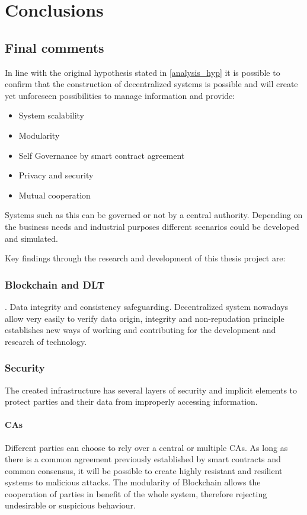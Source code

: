 
\chapter{Conclusions}
\label{ch:conclusion}

\section{Final comments}
In line with the original hypothesis stated in \ref{analysis_hyp} it is possible to confirm that the construction of decentralized systems is possible and will create yet unforeseen possibilities to manage information and provide:
\begin{itemize}
    \item System scalability
    \item Modularity
    \item Self Governance by smart contract agreement
    \item Privacy and security
    \item Mutual cooperation
\end{itemize}

Systems such as this can be governed or not by a central authority. Depending on the business needs and industrial purposes different scenarios could be developed and simulated.

Key findings through the research and development of this thesis project are:
\subsection{Blockchain and DLT}.
Data integrity and consistency safeguarding. Decentralized system nowadays allow very easily to verify data origin, integrity and non-repudation principle  establishes new ways of working and contributing for the development and research of technology.

\subsection{Security}
The created infrastructure has several layers of security and implicit elements to protect parties and their data from improperly accessing information. 
\subsubsection{\ac{CA}s}
Different parties can choose to rely over a central or multiple \ac{CA}s. As long as there is a common agreement previously established by smart contracts and common consensus, it will be possible to create highly resistant and resilient systems to malicious attacks. The modularity of Blockchain allows the cooperation of parties in benefit of the whole system, therefore rejecting undesirable or suspicious behaviour.

